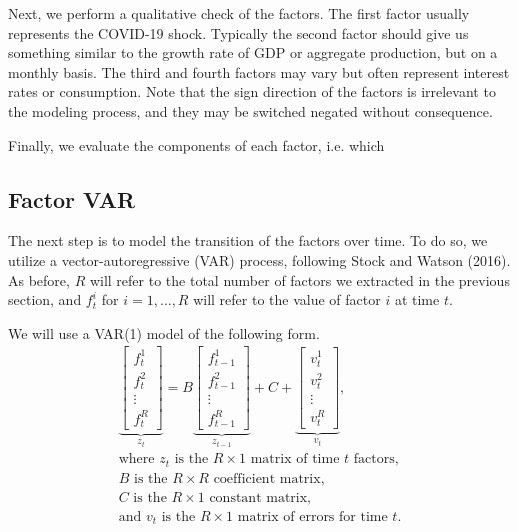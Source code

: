 \documentclass[11pt, letterpaper]{article}\usepackage[]{graphicx}\usepackage[]{color}
\makeatletter
\newenvironment{kframe}{%
 \def\at@end@of@kframe{}%
 \ifinner\ifhmode%
  \def\at@end@of@kframe{\end{minipage}}%
  \begin{minipage}{\columnwidth}%
 \fi\fi%
 \def\FrameCommand##1{\hskip\@totalleftmargin \hskip-\fboxsep
 \colorbox{shadecolor}{##1}\hskip-\fboxsep
     \hskip-\linewidth \hskip-\@totalleftmargin \hskip\columnwidth}%
 \MakeFramed {\advance\hsize-\width
   \@totalleftmargin\z@ \linewidth\hsize
   \@setminipage}}%
 {\par\unskip\endMakeFramed%
 \at@end@of@kframe}
\makeatother
\begin{document}
Next, we perform a qualitative check of the factors. The first factor usually represents the COVID-19 shock. Typically the second factor should give us something similar to the growth rate of GDP or aggregate production, but on a monthly basis. The third and fourth factors may vary but often represent interest rates or consumption. Note that the sign direction of the factors is irrelevant to the modeling process, and they may be switched negated without consequence. 

Finally, we evaluate the components of each factor, i.e. which 
\begin{kframe}


{\ttfamily\noindent\bfseries{}}\end{kframe}



\subsection{Factor VAR}
The next step is to model the transition of the factors over time. To do so, we utilize a vector-autoregressive (VAR) process, following Stock and Watson (2016). As before, $R$ will refer to the total number of factors we extracted in the previous section, and $f^i_t$ for $i = 1, \dots, R$ will refer to the value of factor $i$ at time $t$.

We will use a VAR(1) model of the following form.
\begin{align*}
\underbrace{\begin{bmatrix}
	f^1_{t}\\
	f^2_{t}\\
	\vdots \\
	f^R_{t}
\end{bmatrix}}_{z_t}
=
B
\underbrace{\begin{bmatrix}
	f^1_{t-1}\\
	f^2_{t-1}\\
	\vdots \\
	f^R_{t-1}
\end{bmatrix}}_{z_{t-1}}
+
C
+
\underbrace{\begin{bmatrix}
v^1_t\\
v^2_t\\
\vdots\\
v^R_t
\end{bmatrix}}_{v_t},\\
\text{where $z_t$ is the $R \times 1$ matrix of time $t$ factors,}\\
\text{$B$ is the $R \times R$ coefficient matrix,}\\
\text{$C$ is the $R \times 1$ constant matrix,}\\
\text{and $v_t$ is the $R \times 1$ matrix of errors for time $t$.}
\end{align*}
\end{document}
